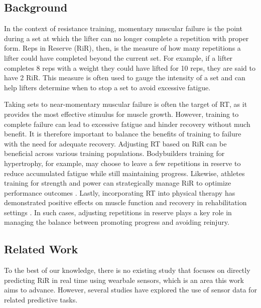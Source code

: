 \documentclass[conference]{IEEEtran}
\begin{document}
\subsection{Background}
In the context of resistance training, momentary muscular failure is the point during a set at which the lifter can no longer complete a repetition with proper form. Reps in Reserve (RiR), then, is the measure of how many repetitions a lifter could have completed beyond the current set. For example, if a lifter completes 8 reps with a weight they could have lifted for 10 reps, they are said to have 2 RiR. This measure is often used to gauge the intensity of a set and can help lifters determine when to stop a set to avoid excessive fatigue. 

Taking sets to near-momentary muscular failure is often the target of RT, as it provides the most effective stimulus for muscle growth. However, training to complete failure can lead to excessive fatigue and hinder recovery without much benefit. It is therefore important to balance the benefits of training to failure with the need for adequate recovery. Adjusting RT based on RiR can be beneficial across various training populations. Bodybuilders training for hypertrophy, for example, may choose to leave a few repetitions in reserve to reduce accumulated fatigue while still maintaining progress. Likewise, athletes training for strength and power can strategically manage RiR to optimize performance outcomes \cite{refalo2024similar, izquierdo2006differential}. Lastly, incorporating RT into physical therapy has demonstrated positive effects on muscle function and recovery in rehabilitation settings \cite{kristensen2012resistance}. In such cases, adjusting repetitions in reserve plays a key role in managing the balance between promoting progress and avoiding reinjury.

\subsection{Related Work}
To the best of our knowledge, there is no existing study that focuses on directly predicting RiR in real time using wearbale sensors, which is an area this work aims to advance. However, several studies have explored the use of sensor data for related predictive tasks.
\end{document}
